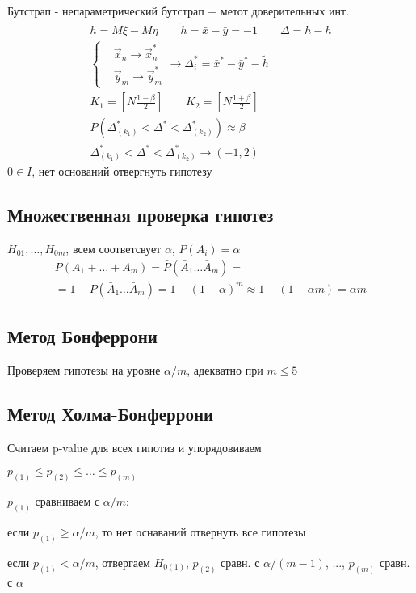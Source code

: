 \documentclass{article}
\begin{document}
Бутстрап - непараметрический бутстрап + метот доверительных инт.
\begin{gather*}
  h=M\xi - M\eta \qquad \tilde{h}=\bar{x}-\bar{y}=-1 \qquad \Delta=\tilde{h}-h \\ 
  \left\{\begin{aligned}
    & \vec{x}_n \to \vec{x}_n^{*} \\
    & \vec{y}_m \to \vec{y}_m^{*}
  \end{aligned}\right. \to \Delta_i^{*}=\bar{x}^{*}-\bar{y}^{*}-\tilde{h} \\ 
  K_1=[N\frac{1-\beta}{2}] \qquad K_2=[N\frac{1+\beta}{2}] \\ 
  P(\Delta^{*}_{(k_1)} < \Delta^{*} < \Delta^{*}_{(k_2)}) \approx \beta \\ 
\Delta^{*}_{(k_1)} < \Delta^{*} < \Delta^{*}_{(k_2)} \to (-1, 2)
\end{gather*}
$0 \in I$, нет оснований отвергнуть гипотезу

\subsection{Множественная проверка гипотез}
$H_{01}, \dots , H_{0m}$, всем соответсвует $\alpha$, $P(A_i)=\alpha $
\begin{gather*}
  P(A_1 + \dots + A_m)=\bar{P}({\bar{A}_1\dots \bar{A}_m}) = \\
  = 1 - P(\bar{A}_1\dots \bar{A}_m)= 1 - (1-\alpha)^{m} \approx 1 - (1-\alpha m) = \alpha m
\end{gather*}
\subsection{Метод Бонферрони}
Проверяем гипотезы на уровне $\alpha/m$, адекватно при $m \le 5$
\subsection{Метод Холма-Бонферрони}
Считаем p-value для всех гипотиз и упорядовиваем

$p_{(1)} \le p_{(2)} \le \dots  \le p_{(m)}$

$p_{(1)}$ сравниваем с $\alpha/m$: 

если $p_{(1)} \ge \alpha/m$, то нет оснаваний отвернуть все гипотезы

если $p_{(1)} < \alpha /m$, отвергаем $H_{0(1)}$, $p_{(2)}$ сравн. с $\alpha/(m-1)$, ..., $p_{(m)}$ сравн. с $\alpha$

\end{document}
